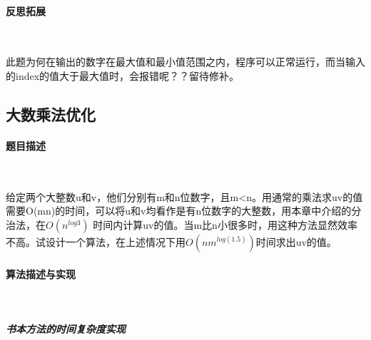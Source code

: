 \documentclass[UTF8]{ctexart}
\begin{document}
    \paragraph{反思拓展}

    ~

    此题为何在输出的数字在最大值和最小值范围之内，程序可以正常运行，而当输入的index的值大于最大值时，会报错呢？？留待修补。

    \subsection{大数乘法优化}
    \paragraph{题目描述}

    ~

    给定两个大整数u和v，他们分别有m和n位数字，且m<n。用通常的乘法求uv的值需要O(mn)的时间，可以将u和v均看作是有n位数字的大整数，用本章中介绍的分治法，在$O(n^{log3})$ 时间内计算uv的值。当m比n小很多时，用这种方法显然效率不高。试设计一个算法，在上述情况下用$O(nm^ {log(1.5)})$时间求出uv的值。

    \paragraph{算法描述与实现}

    ~

    \subparagraph{书本方法的时间复杂度实现}

    ~
\end{document}
